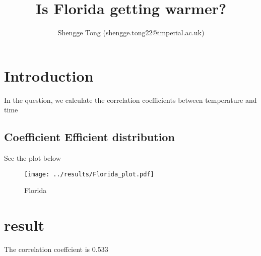 \documentclass{article}
\title{Is Florida getting warmer?}
\author{Shengge Tong (shengge.tong22@imperial.ac.uk)}
\begin{document}
\maketitle

\section{Introduction}
In the question, we calculate the correlation coefficients between temperature and time

\subsection{Coefficient Efficient distribution}
See the plot below
\begin{figure}[H]
\centering
\texttt{[image: ../results/Florida\_plot.pdf]}
\caption{\label{fig:Florida_plot.pdf}Florida}
\end{figure}

\section{result}
  The correlation coeffcient is 0.533
\end{document}
